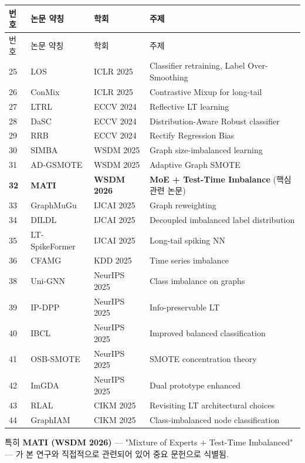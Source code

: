 \begingroup
\footnotesize
\begin{longtable}{>{\raggedleft\arraybackslash}p{}>{\raggedright\arraybackslash}p{}>{\raggedright\arraybackslash}p{}>{\raggedright\arraybackslash}p{}}
\toprule
번호 & 논문 약칭 & 학회 & 주제 \\ \midrule
\endfirsthead
번호 & 논문 약칭 & 학회 & 주제 \\ \midrule
\endhead
{}25 & LOS & ICLR 2025 & Classifier retraining, Label Over-Smoothing \\
{}26 & ConMix & ICLR 2025 & Contrastive Mixup for long-tail \\
{}27 & LTRL & ECCV 2024 & Reflective LT learning \\
{}28 & DaSC & ECCV 2024 & Distribution-Aware Robust classifier \\
{}29 & RRB & ECCV 2024 & Rectify Regression Bias \\
{}30 & SIMBA & WSDM 2025 & Graph size-imbalanced learning \\
{}31 & AD-GSMOTE & WSDM 2025 & Adaptive Graph SMOTE \\
{}\textbf{32} & \textbf{MATI} & \textbf{WSDM 2026} & \textbf{MoE +\allowbreak{} Test-Time Imbalance} (핵심 관련 논문) \\
{}33 & GraphMuGu & IJCAI 2025 & Graph reweighting \\
{}34 & DILDL & IJCAI 2025 & Decoupled imbalanced label distribution \\
{}35 & LT-SpikeFormer & IJCAI 2025 & Long-tail spiking NN \\
{}36 & CFAMG & KDD 2025 & Time series imbalance \\
{}38 & Uni-GNN & NeurIPS 2025 & Class imbalance on graphs \\
{}39 & IP-DPP & NeurIPS 2025 & Info-preservable LT \\
{}40 & IBCL & NeurIPS 2025 & Improved balanced classification \\
{}41 & OSB-SMOTE & NeurIPS 2025 & SMOTE concentration theory \\
{}42 & ImGDA & NeurIPS 2025 & Dual prototype enhanced \\
{}43 & RLAL & CIKM 2025 & Revisiting LT architectural choices \\
{}44 & GraphIAM & CIKM 2025 & Class-imbalanced node classification \\
\bottomrule
\end{longtable}
\endgroup
특히 \textbf{MATI (WSDM 2026)} — "Mixture of Experts +\allowbreak{} Test-Time Imbalanced" — 가 본 연구와 직접적으로 관련되어 있어 중요 문헌으로 식별됨.

